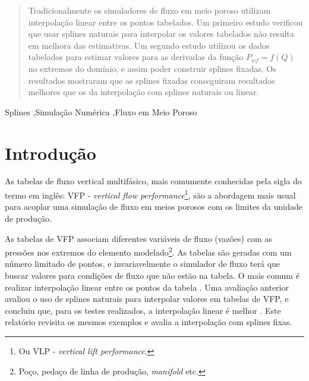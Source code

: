 \documentclass[final,5p]{elsarticle}
\numberwithin{equation}{section}
\begin{document}
\begin{frontmatter}
\begin{abstract}
    Tradicionalmente os simuladores de fluxo em meio poroso utilizam interpolação linear entre os pontos tabelados. Um primeiro estudo verificou que usar splines naturais para interpolar os valores tabelados não resulta em melhora das estimativas. Um segundo estudo utilizou os dados tabelados para estimar valores para as derivadas da função $P_{wf}=f(Q)$ no extremos do domínio, e assim poder construir splines fixadas. Os resultados mostraram que as splines fixadas conseguiram resultados melhores que os da interpolação com splines naturais ou linear.
    
\end{abstract}




\begin{keyword}
    Splines \sep Simulação Numérica \sep Fluxo em Meio Poroso



\end{keyword}

\end{frontmatter}


\section{Introdução}

    As tabelas de fluxo vertical multifásico, mais comumente conhecidas pela sigla do termo em inglês: VFP - \emph{vertical flow performance}\footnote{Ou VLP - \emph{vertical lift performance}.}, são a abordagem mais usual para acoplar uma simulação de fluxo em meios porosos com os limites da unidade de produção.

    As tabelas de VFP associam diferentes variáveis de fluxo (vazões) com as pressões nos extremos do elemento modelado\footnote{Poço, pedaço de linha de produção, \emph{manifold} etc.}. As tabelas são geradas com um número limitado de pontos, e invariavelmente o simulador de fluxo terá que buscar valores para condições de fluxo que não estão na tabela. O mais comum é realizar interpolação linear entre os pontos da tabela \cite{computer2022cmg}\cite{schlumberger2009technical}. Uma avaliação anterior avaliou o uso de splines naturais para interpolar valores em tabelas de VFP, e concluiu que, para os testes realizados, a interpolação linear é melhor \cite{relatoriosplinesnaturais}. Este relatório revisita os mesmos exemplos e avalia a interpolação com splines fixas.
\end{document}
